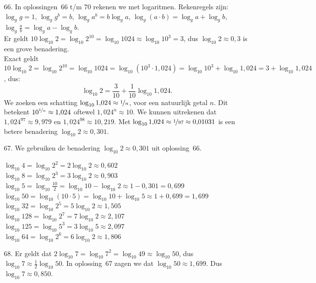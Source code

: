 \begin{problem}{66.}
	In oplossingen~66 t/m 70 rekenen we met logaritmen. Reken\-regels zijn: $\log_g g = 1$, $\log_g g^b = b$, $\log_g a^b = b \log_g a$, $\log_g (a \cdot b) = \log_g a + \log_g b$, $\log_g \frac{a}{b} = \log_g a - \log_g b$.\\

    Er geldt $10 \log_{10} 2 = \log_{10} 2^{10} = \log_{10} 1024 \approx \log_{10} {10}^3 = 3$, dus $\log_{10} 2 \approx 0{,}3$ is een grove benadering.\\Exact geldt $10 \log_{10} 2 = \log_{10} 2^{10} = \log_{10} 1024 = \log_{10} ({10}^3 \cdot 1{,}024) = \log_{10} {10}^3 + \log_{10} 1{,}024 = 3 + \log_{10} 1{,}024$, dus:
    \begin{equation*}
        \log_{10} 2 = \frac{3}{10} + \frac{1}{10} \log_{10} 1{,}024.
    \end{equation*}
    We zoeken een schatting $\log_{10} 1{,}024 \approx \nicefrac{1}{n}$, voor een natuurlijk getal $n$. Dit betekent ${10}^{\nicefrac{1}{n}} \approx 1{,}024$ oftewel ${1{,}024}^n \approx 10$. We kunnen uitrekenen dat ${1{,}024}^{97} \approx 9{,}979$ en ${1{,}024}^{98} \approx 10{,}219$. Met $\log_{10} 1{,}024 \approx \nicefrac{1}{97} \approx 0{,}01031$ is een betere benadering $\log_{10} 2 \approx 0{,}301$.
\end{problem}

\begin{problem}{67.}
	We gebruiken de benadering $\log_{10} 2 \approx 0{,}301$ uit oplossing~66.

\noindent $\log_{10} 4 = \log_{10} 2^2 = 2 \log_{10} 2 \approx 0{,}602$\\
$\log_{10} 8 = \log_{10} 2^3 = 3 \log_{10} 2 \approx 0{,}903$\\
$\log_{10} 5 = \log_{10} \frac{10}{2} = \log_{10} 10 - \log_{10} 2 \approx 1 - 0{,}301 = 0{,}699$\\
$\log_{10} 50 = \log_{10} (10 \cdot 5) = \log_{10} 10 + \log_{10} 5 \approx 1 + 0{,}699 = 1{,}699$\\
$\log_{10} 32 = \log_{10} 2^5 = 5 \log_{10} 2 \approx 1{,}505$\\
$\log_{10} 128 = \log_{10} 2^7 = 7 \log_{10} 2 \approx 2{,}107$\\
$\log_{10} 125 = \log_{10} 5^3 = 3 \log_{10} 5 \approx 2{,}097$\\
$\log_{10} 64 = \log_{10} 2^6 = 6 \log_{10} 2 \approx 1{,}806$
\end{problem}

\begin{problem}{68.}
	Er geldt dat $2 \log_{10} 7 = \log_{10} 7^2 = \log_{10} 49 \approx \log_{10} 50$, dus $\log_{10} 7 \approx \frac{1}{2} \log_{10} 50$. In oplossing~67 zagen we dat $\log_{10} 50 \approx 1{,}699$. Dus $\log_{10} 7 \approx 0{,}850$.
\end{problem}

